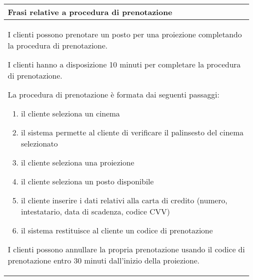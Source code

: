 \begin{tabularx}{\linewidth}{|X|}
      \hline
      \rowcolor{tblhdrcolor}
      \textbf{Frasi relative a procedura di prenotazione} \\\hline
      I clienti possono prenotare un posto per una proiezione
      completando la procedura di prenotazione.

      I clienti hanno a disposizione 10 minuti per completare la
      procedura di prenotazione.

      La procedura di prenotazione è formata dai seguenti passaggi:
      \begin{enumerate}
            \item il cliente seleziona un cinema
            \item il sistema permette al cliente di verificare
                  il palinsesto del cinema selezionato
            \item il cliente seleziona una proiezione
            \item il cliente seleziona un posto disponibile
            \item il cliente inserire i dati relativi alla carta
                  di credito (numero, intestatario, data di scadenza,
                  codice CVV)
            \item il sistema restituisce al cliente un codice di
                  prenotazione
      \end{enumerate}

      I clienti possono annullare la propria prenotazione usando il
      codice di prenotazione entro 30 minuti dall'inizio della
      proiezione.
      \\ \hline
\end{tabularx}

